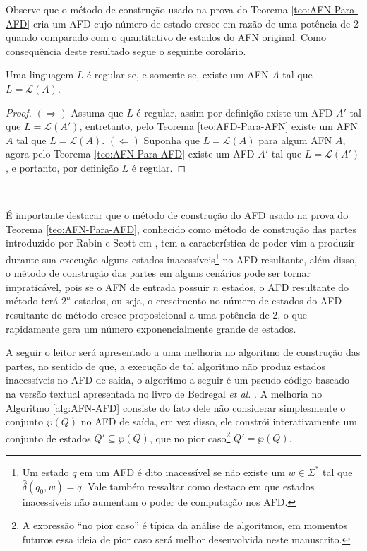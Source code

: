 Observe que o método de construção usado na prova do Teorema \ref{teo:AFN-Para-AFD} cria um AFD cujo número de estado cresce em razão de uma potência de 2 quando comparado com o quantitativo de estados do AFN original. Como consequência deste resultado segue o seguinte corolário.

\begin{corollary}
	Uma linguagem $L$ é regular se, e somente se, existe um AFN $A$ tal que $L = \mathcal{L}(A)$.
\end{corollary}

\begin{proof}
	$(\Rightarrow)$ Assuma que $L$ é regular, assim por definição existe um AFD $A'$ tal que $L = \mathcal{L}(A')$, entretanto, pelo Teorema \ref{teo:AFD-Para-AFN} existe um AFN $A$ tal que $L = \mathcal{L}(A)$. $(\Leftarrow)$ Suponha que $L = \mathcal{L}(A)$ para algum AFN $A$, agora pelo Teorema \ref{teo:AFN-Para-AFD} existe um AFD $A'$ tal que $L = \mathcal{L}(A')$, e portanto, por definição $L$ é regular.
\end{proof}

\

É importante destacar que o método de construção do AFD usado na prova do Teorema \ref{teo:AFN-Para-AFD}, conhecido como método de construção das partes introduzido por Rabin e Scott em \cite{rabin1959}, tem a característica de poder vim a produzir durante sua execução alguns estados inacessíveis\footnote{Um estado $q$ em um AFD é dito inacessível se não existe um $w \in \Sigma^*$ tal que $\widehat{\delta}(q_0, w) = q$. Vale também ressaltar como destaco em \cite{benjaLivro2010, hopcroft2008} que estados inacessíveis não aumentam o poder de computação nos AFD.} no AFD resultante, além disso,  o método de construção das partes em alguns cenários pode ser tornar impraticável, pois se o AFN de entrada possuir $n$ estados, o AFD resultante do método terá $2^n$ estados, ou seja, o crescimento no número de estados do AFD resultante do método cresce proposicional a uma potência de 2, o que rapidamente gera um número exponencialmente grande de estados. 

A seguir o leitor será apresentado a uma melhoria no algoritmo de construção das partes, no sentido de que, a execução de tal algoritmo não produz estados inacessíveis no AFD de saída, o algoritmo a seguir é um pseudo-código baseado na versão textual apresentada no livro de Bedregal \textit{et al.} \cite{benjaLivro2010}. A melhoria no Algoritmo \ref{alg:AFN-AFD} consiste do fato dele não considerar simplesmente o conjunto $\wp(Q)$ no AFD de saída, em vez disso, ele constrói interativamente um conjunto de estados $Q' \subseteq \wp(Q)$, que no pior caso\footnote{A expressão ``no pior caso'' é típica da análise de algoritmos, em momentos futuros essa ideia de pior caso será melhor desenvolvida neste manuscrito.} $Q' = \wp(Q)$.

